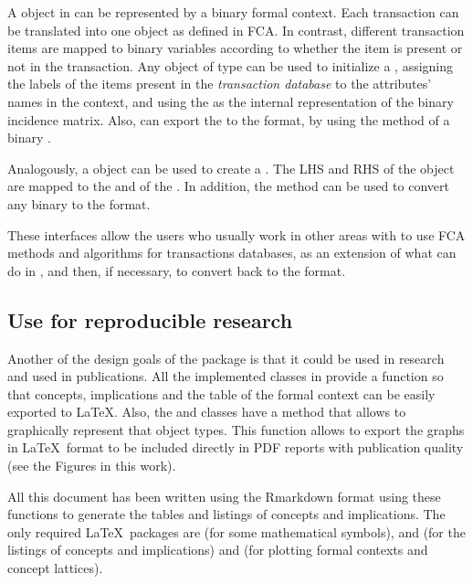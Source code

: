 A  object in  can be represented by a
binary formal context. Each transaction can be translated into one
object as defined in FCA. In contrast, different transaction items are
mapped to binary variables according to whether the item is present or
not in the transaction. Any object of type  can be
used to initialize a , assigning the labels of the
items present in the \emph{transaction database} to the attributes'
names in the context, and using the  as the internal
representation of the binary incidence matrix. Also,  can
export the  to the  format,
by using the  method of a binary
.

Analogously, a  object can be used to create a
. The LHS and RHS of the  object
are mapped to the  and  of the
. In addition, the method  can
be used to convert any binary  to the
 format.

These interfaces allow the users who usually work in other areas with
 to use FCA methods and algorithms for transactions
databases, as an extension of what can do in , and then, if
necessary, to convert back to the  format.

\hypertarget{use-for-reproducible-research}{%
\subsection{Use for reproducible
research}\label{use-for-reproducible-research}}

Another of the design goals of the  package is that it could
be used in research and used in publications. All the implemented
classes in  provide a  function so that
concepts, implications and the table of the formal context can be easily
exported to \LaTeX. Also, the  and
 classes have a  method that allows
to graphically represent that object types. This  function
allows to export the graphs in \LaTeX~format to be included directly in
PDF reports with publication quality (see the Figures in this work).

All this document has been written using the Rmarkdown format using
these functions to generate the tables and listings of concepts and
implications. The only required \LaTeX~packages are  (for
some mathematical symbols),  and  (for the
listings of concepts and implications) and  (for plotting
formal contexts and concept lattices).


